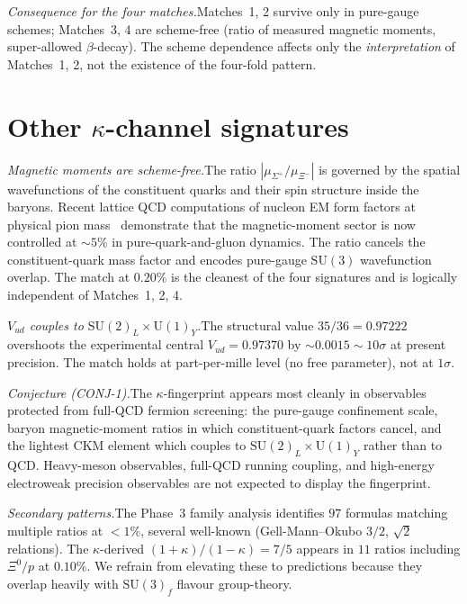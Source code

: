 \documentclass[aps,prl,reprint,amsmath,amssymb,nofootinbib,floatfix,superscriptaddress]{revtex4-2}
\newcommand{\SU}{\mathrm{SU}}
\begin{document}
\textit{Consequence for the four matches.}\quad Matches~1, 2 survive only in pure-gauge schemes; Matches~3, 4 are scheme-free (ratio of measured magnetic moments, super-allowed $\beta$-decay). The scheme dependence affects only the \emph{interpretation} of Matches~1, 2, not the existence of the four-fold pattern.

\section{Other $\kappa$-channel signatures}
\label{sec:other-patterns}

\textit{Magnetic moments are scheme-free.}\quad The ratio $|\mu_{\Sigma^+}/\mu_{\Xi^-}|$ is governed by the spatial wavefunctions of the constituent quarks and their spin structure inside the baryons. Recent lattice QCD computations of nucleon EM form factors at physical pion mass~\cite{Alexandrou1812} demonstrate that the magnetic-moment sector is now controlled at ${\sim}5\%$ in pure-quark-and-gluon dynamics. The ratio cancels the constituent-quark mass factor and encodes pure-gauge $\SU(3)$ wavefunction overlap. The match at $0.20\%$ is the cleanest of the four signatures and is logically independent of Matches~1, 2, 4.

\textit{$V_{ud}$ couples to $\SU(2)_L\times\mathrm{U}(1)_Y$.}\quad The structural value $35/36 = 0.97222$ overshoots the experimental central $V_{ud} = 0.97370$ by $\sim 0.0015 \sim 10\sigma$ at present precision. The match holds at part-per-mille level (no free parameter), not at $1\sigma$.

\textit{Conjecture (CONJ-1).}\quad The $\kappa$-fingerprint appears most cleanly in observables protected from full-QCD fermion screening: the pure-gauge confinement scale, baryon magnetic-moment ratios in which constituent-quark factors cancel, and the lightest CKM element which couples to $\SU(2)_L \times \mathrm{U}(1)_Y$ rather than to QCD. Heavy-meson observables, full-QCD running coupling, and high-energy electroweak precision observables are not expected to display the fingerprint.

\textit{Secondary patterns.}\quad The Phase~3 family analysis identifies $97$ formulas matching multiple ratios at $<1\%$, several well-known (Gell-Mann--Okubo $3/2$, $\sqrt{2}$ relations). The $\kappa$-derived $(1+\kappa)/(1-\kappa) = 7/5$ appears in $11$ ratios including $\Xi^0/p$ at $0.10\%$. We refrain from elevating these to predictions because they overlap heavily with $\SU(3)_f$ flavour group-theory.
\end{document}
